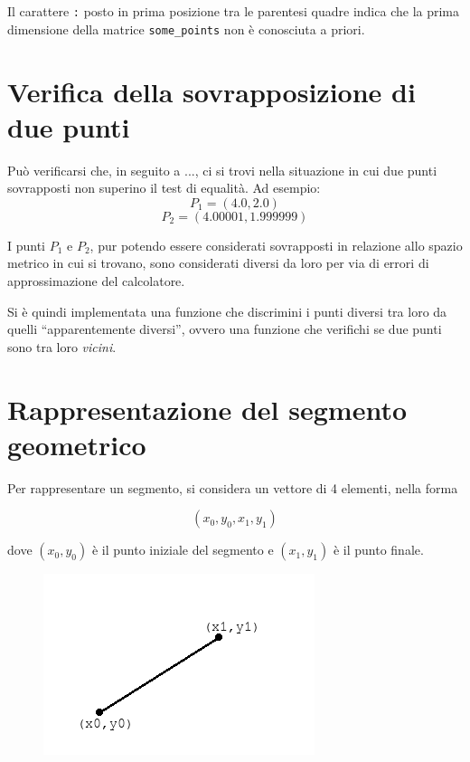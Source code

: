 \documentclass[11pt,a4paper]{report}
\newcommand{\modelicaclass}[1]{
	
}
\begin{document}
Il carattere \verb|:| posto in prima posizione tra le parentesi quadre indica che la prima dimensione della matrice \verb|some_points| non è conosciuta a priori.

\section{Verifica della sovrapposizione di due punti}

Può verificarsi che, in seguito a ..., ci si trovi nella situazione in cui due punti sovrapposti non superino il test di equalità. Ad esempio:
\[
P_1 = (4.0, 2.0)
\]
\[
P_2 = (4.00001, 1.999999)
\]

I punti $P_1$ e $P_2$, pur potendo essere considerati sovrapposti in relazione allo spazio metrico in cui si trovano, sono considerati diversi da loro per via di errori di approssimazione del calcolatore.


Si è quindi implementata una funzione che discrimini i punti diversi tra loro da quelli ``apparentemente diversi'', ovvero una funzione che verifichi se due punti sono tra loro \textit{vicini}.

\begin{figure}[H]
\modelicaclass{PointsAreClose.mo}
\end{figure}

\section{Rappresentazione del segmento geometrico}

Per rappresentare un segmento, si considera un vettore di 4 elementi, nella forma

\[
(x_0, y_0, x_1, y_1)
\]

dove $(x_0, y_0)$ è il punto iniziale del segmento e $(x_1, y_1)$ è il punto finale.

\begin{figure}[H]
\centering
\includegraphics[scale=0.5]{segmento.png}
\end{figure}
\end{document}
